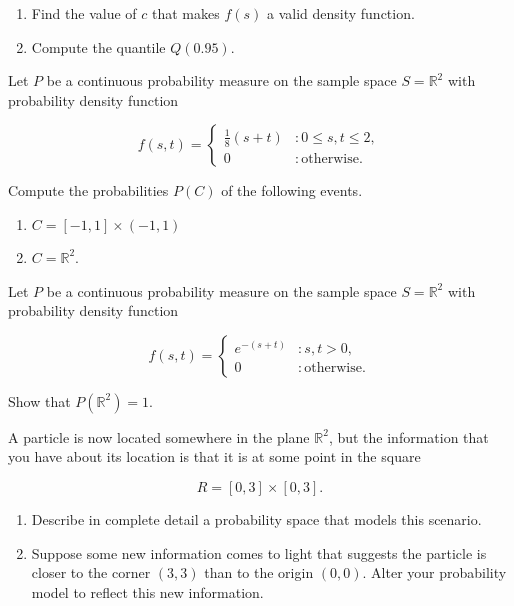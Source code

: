 \documentclass[12pt,reqno]{amsart}
\begin{document}
\medskip
\begin{enumerate}
\item Find the value of $c$ that makes $f(s)$ a valid density function.\vfill
\item Compute the quantile $Q(0.95)$.\vfill
\end{enumerate}












\newpage
\prob Let $P$ be a continuous probability measure on the sample space $S=\mathbb{R}^2$ with probability density function

	\[
	f(s,t) = \begin{cases}
	\frac{1}{8}(s+t) & : 0\leq s,t \leq 2, \\
	0 & : \text{otherwise}.    
	\end{cases}
	\]

Compute the probabilities $P(C)$ of the following events.

\medskip
\begin{enumerate}
\item $C=[-1,1] \times (-1,1)$\vfill
\item $C = \mathbb{R}^2$.\vfill
\end{enumerate}












\prob Let $P$ be a continuous probability measure on the sample space $S=\mathbb{R}^2$ with probability density function

	\[
	f(s,t) = \begin{cases}
	e^{-(s+t)} & : s,t >0, \\
	0 & : \text{otherwise}.    
	\end{cases}
	\]

Show that $P(\mathbb{R}^2)=1$.\vfill

















\newpage
\prob A particle is now located somewhere in the plane $\mathbb{R}^2$, but the  information that you have about its location is that it is at some point in the square

	\[
	R = [0,3] \times [0,3].
	\]

\medskip
\begin{enumerate}
\item Describe in complete detail a probability space that models this scenario.\vfill
\item Suppose some new information comes to light that suggests the particle is closer to the corner $(3,3)$ than to the origin $(0,0)$. Alter your probability model to reflect this new information.\vfill
\end{enumerate}
    
   
\end{document}
